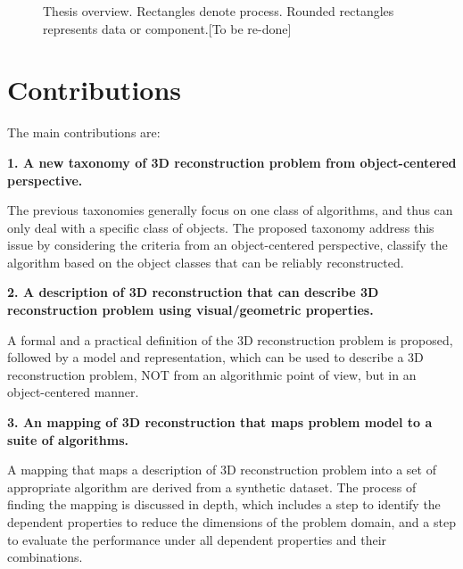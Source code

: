 \begin{figure}[ht]
\caption{Thesis overview. Rectangles denote process. Rounded rectangles represents data or component.[To be re-done]}
\label{fig:system_overview}
\end{figure}

\section{Contributions}
The main contributions are:

\noindent\textbf{1. A new taxonomy of 3D reconstruction problem from object-centered perspective.}

The previous taxonomies generally focus on one class of algorithms, and thus can only deal with a specific class of objects. The proposed taxonomy address this issue by considering the criteria from an object-centered perspective, \ie classify the algorithm based on the object classes that can be reliably reconstructed.

\noindent\textbf{2. A description of 3D reconstruction that can describe 3D reconstruction problem using visual/geometric properties.}

A formal and a practical definition of the 3D reconstruction problem is proposed, followed by a model and representation, which can be used to describe a 3D reconstruction problem, NOT from an algorithmic point of view, but in an object-centered manner.

\noindent\textbf{3. An mapping of 3D reconstruction that maps problem model to a suite of algorithms.}

A mapping that maps a description of 3D reconstruction problem into a set of appropriate algorithm are derived from a synthetic dataset. The process of finding the mapping is discussed in depth, which includes a step to identify the dependent properties to reduce the dimensions of the problem domain, and a step to evaluate the performance under all dependent properties and their combinations.

